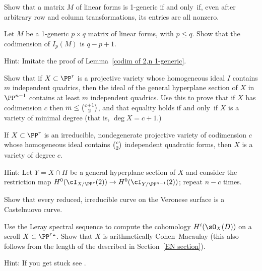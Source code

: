 \begin{exercise}
Show that a matrix $M$ of linear forms is 1-generic if and only~if,
even after arbitrary row and column transformations, its entries are
all nonzero.
\end{exercise}

\begin{exercise}
Let $M$ be a 1-generic $p\times q$ matrix of linear forms, with $p\leq
q$. Show that the codimension of
$I_p(M)$ is $q-p+1$. 

Hint: Imitate the proof of Lemma~\ref{codim of 2,n 1-generic}.
\end{exercise}

\begin{exercise}
Show that if $X\subset \PP^r$ is a projective variety whose homogeneous
ideal $I$ contains $m$ independent quadrics, then the ideal of the
general hyperplane section of $X$ in $\PP^{n-1}$
contains at least $m$ independent quadrics. Use this to prove that if $X$
has codimension $c$ then $m\leq \tbinom{c+1}{2}$, and that equality holds
if and only~if
$X$ is a variety of minimal degree (that is, $\deg X = c+1$.)
\end{exercise}

\begin{exercise}\label{many quadrics}
If $X \subset \PP^r$ is an irreducible, nondegenerate projective variety
of codimension $c$ whose homogeneous ideal
contains $\tbinom{c}{2}$ independent quadratic forms, then $X$ is a
variety of degree $c$.

Hint: Let $Y = X \cap H$ be a general hyperplane section of $X$
and consider the restriction map $H^0(\cI_{X/\PP^r}(2)) \to
H^0(\cI_{Y/\PP^{n-1}}(2))$; repeat $n-c$ times.
\end{exercise}

\begin{exercise}\label{Castelnuovo Veronese}
Show that every reduced, irreducible curve on the Veronese surface is
%
%
a Castelnuovo curve.
\end{exercise}

\begin{exercise}\label{cohomology of invertible sheaves on a scroll}
Use the Leray spectral sequence
%
 to compute the cohomology
$H^{i}(\sO_{X}(D))$ on a scroll $X\subset \PP^r` `$.
Show that $X$ is arithmetically Cohen--Macaulay
%
(this also follows from
the length of the 
%
described in Section~\ref{EN section}).

Hint: If you get stuck see \cite[Section V.1]{Hartshorne1977}.
\end{exercise}

